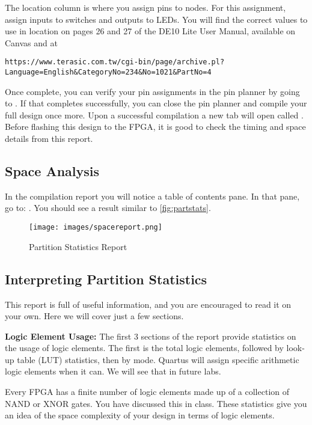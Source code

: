 \documentclass[12pt]{betterjournal}
\newcommand{\keyword}[1]{{\usefont{OT1}{lmtt}{b}{n}#1}}
\begin{document}
The location column is where you assign pins to nodes. For this assignment, assign inputs to switches and outputs to LEDs. You will find the correct values to use in location on pages 26 and 27 of the DE10 Lite User Manual, available on Canvas and at 
\footnotesize
\begin{verbatim}
https://www.terasic.com.tw/cgi-bin/page/archive.pl?Language=English&CategoryNo=234&No=1021&PartNo=4
\end{verbatim}
\normalsize
Once complete, you can verify your pin assignments in the pin planner by going to . If that completes successfully, you can close the pin planner and compile your full design once more. Upon a successful compilation a new tab will open called \keyword{{Compilation Report - top}}. Before flashing this design to the FPGA, it is good to check the timing and space details from this report.

\subsection{Space Analysis}
\label{ss:spaceanalysis}
In the compilation report you will notice a table of contents pane. In that pane, go to: . You should see a result similar to \autoref{fig:partstats}.

\begin{figure}
    \centering
    \texttt{[image: images/spacereport.png]}
    \caption{Partition Statistics Report}
    \label{fig:partstats}
\end{figure}

\subsection{Interpreting Partition Statistics}
This report is full of useful information, and you are encouraged to read it on your own. Here we will cover just a few sections.

\textbf{Logic Element Usage:} The first 3 sections of the report provide statistics on the usage of logic elements. The first is the total logic elements, followed by look-up table (LUT) statistics, then by mode. Quartus will assign specific arithmetic logic elements when it can. We will see that in future labs.

Every FPGA has a finite number of logic elements made up of a collection of NAND or XNOR gates. You have discussed this in class. These statistics give you an idea of the space complexity of your design in terms of logic elements.
\end{document}
